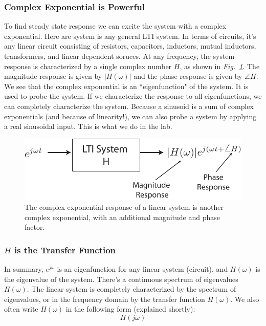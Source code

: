 \subsubsection{Complex Exponential is Powerful}
To find steady state response we can excite the system with a complex exponential.   Here are system is any general LTI system. In terms of circuits, it's any linear circuit consisting of resistors, capacitors, inductors, mutual inductors, transformers, and linear dependent soruces.  At any frequency, the system response is characterized by a single complex number $H$, as shown in \emph{Fig.~\ref{fig:lti_resp}}.   The magnitude response is given by $|H(\omega)|$ and
the phase response is given by $\angle H$.   We see that the complex exponential is an ``eigenfunction" of the system.  It is used to probe the system.  If we characterize the response to all eigenfunctions, we can completely characterize the system.   Because a sinusoid is a sum of complex exponentials (and because of linearity!), we can also probe a system by applying a real sinusoidal input.  This is what we do in the lab.
\begin{figure}[tb]
\centering
\includegraphics[width=.65\columnwidth]{lti_resp}
\caption{The complex exponential response of a linear system is another complex exponential, with an additional magnitude and phase factor. }
\label{fig:lti_resp}
\end{figure}
\subsubsection{$H$ is the Transfer Function}
In summary, $e^{j\omega}$ is an eigenfunction for any linear system (circuit), and $H(\omega)$ is the eigenvalue of the system.  There's a continuous spectrum of eigenvalues $H(\omega)$.   The linear system is completely characterized by the spectrum of eigenvalues, or in the frequency domain by the transfer function $H(\omega)$.  We also often write $H(\omega)$ in the following form (explained shortly):
    \begin{equation}
        H(j\omega)
    \end{equation}

